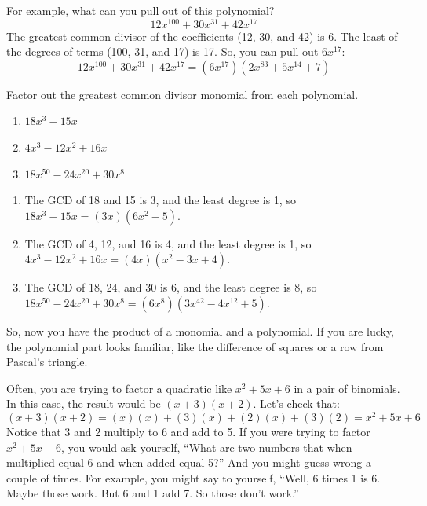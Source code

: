 For example, what can you pull out of this polynomial?
\begin{equation*}
12x^{100} + 30x^{31} + 42x^{17}
\end{equation*}
The greatest common divisor of the coefficients (12, 30, and 42) is 6.  The least of the degrees of terms (100, 31, and 17) is 17.  So, you can pull out $6x^{17}$:
\begin{equation*}
12x^{100} + 30x^{31} + 42x^{17} = (6x^{17})(2x^{83} + 5x^{14} + 7)
\end{equation*}

\begin{Exercise}[title={Factoring out the GCD monomial}, label=gcdmonomial]
Factor out the greatest common divisor monomial from each polynomial.
\begin{enumerate}
\item $18x^3 - 15x$
\item $4x^3 - 12x^2 + 16x$
\item $18x^{50} - 24x^{20} + 30x^{8}$
\end{enumerate}
\end{Exercise}
\begin{Answer}[ref=gcdmonomial]
\begin{enumerate}
\item The GCD of 18 and 15 is 3, and the least degree is 1, so
  $18x^3 - 15x = (3x)(6x^2 - 5)$.
\item The GCD of 4, 12, and 16 is 4, and the least degree is 1, so
  $4x^3 - 12x^2 + 16x = (4x)(x^2 - 3x + 4)$.
\item The GCD of 18, 24, and 30 is 6, and the least degree is 8, so
  $18x^{50} - 24x^{20} + 30x^{8} = (6x^{8})(3x^{42} - 4x^{12} + 5)$.
\end{enumerate}
\end{Answer}


So, now you have the product of a monomial and a polynomial. If you
are lucky, the polynomial part looks familiar, like the difference of
squares or a row from Pascal's triangle.

Often, you are trying to factor a quadratic like $x^2 + 5x + 6$ in a pair
of binomials. In this case, the result would be $(x + 3)(x + 2)$. Let's check that:
\begin{equation*}
  (x + 3)(x + 2) = (x)(x) + (3)(x) + (2)(x) + (3)(2) = x^2 + 5x + 6
\end{equation*}
Notice that 3 and 2 multiply to 6 and add to 5. If you were trying to
factor $x^2 + 5x + 6$, you would ask yourself, ``What are two numbers that
when multiplied equal 6 and when added equal 5?'' And you might
guess wrong a couple of times. For example, you might say to yourself,
``Well, 6 times 1 is 6. Maybe those work. But 6 and 1 add 7. So those
don't work.''

